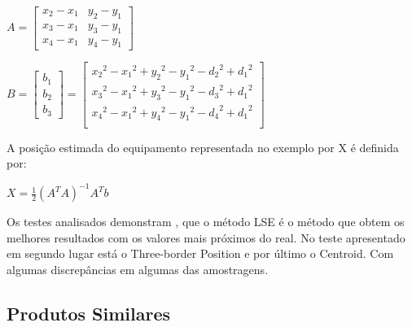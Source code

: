 \begin{center}



$A=\begin{bmatrix}
x_{2}-x_{1} & y_{2}-y_{1}\\
x_{3}-x_{1} & y_{3}-y_{1}\\
x_{4}-x_{1} & y_{4}-y_{1}
\end{bmatrix}$

$B=\begin{bmatrix}
b_{1}\\
b_{2}\\
b_{3}
\end{bmatrix}=\begin{bmatrix}
{x_{2}}^2-{x_{1}}^2  + {y_{2}}^2-{y_{1}}^2 - {d_{2}}^2 + {d_{1}}^2 \\
{x_{3}}^2-{x_{1}}^2  + {y_{3}}^2-{y_{1}}^2 - {d_{3}}^2 + {d_{1}}^2 \\
{x_{4}}^2-{x_{1}}^2  + {y_{4}}^2-{y_{1}}^2 - {d_{4}}^2 + {d_{1}}^2 \\
\end{bmatrix} $

\end{center}

\par A posição estimada do equipamento representada no exemplo por X é definida por:



\par
\begin{center}
$ X= \frac{1}{2}(A^T A)^{-1} A^T b$
\end{center}

\par Os testes analisados demonstram\cite{Wang2013} , que o método LSE é o método que obtem os melhores resultados com os valores mais próximos do real. No teste apresentado em segundo lugar está o Three-border Position e por último o Centroid. Com algumas discrepâncias em algumas das amostragens.

\subsection{Produtos Similares}
